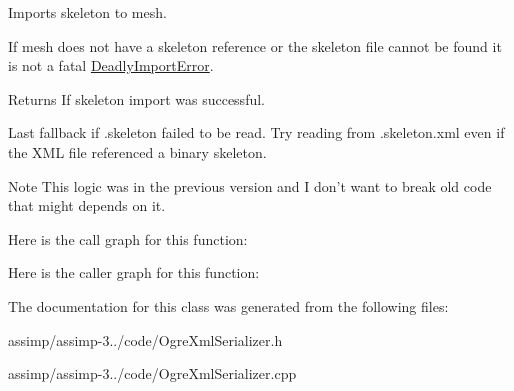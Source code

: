 Imports skeleton to {\ttfamily mesh}. 

If mesh does not have a skeleton reference or the skeleton file cannot be found it is not a fatal \hyperlink{class_deadly_import_error}{Deadly\+Import\+Error}. \begin{DoxyReturn}{Returns}
If skeleton import was successful. 
\end{DoxyReturn}
Last fallback if .skeleton failed to be read. Try reading from .skeleton.\+xml even if the X\+M\+L file referenced a binary skeleton. \begin{DoxyNote}{Note}
This logic was in the previous version and I don't want to break old code that might depends on it. 
\end{DoxyNote}


Here is the call graph for this function\+:




Here is the caller graph for this function\+:




The documentation for this class was generated from the following files\+:\begin{DoxyCompactItemize}
\item 
assimp/assimp-\/3../code/Ogre\+Xml\+Serializer.\+h\item 
assimp/assimp-\/3../code/Ogre\+Xml\+Serializer.\+cpp\end{DoxyCompactItemize}
